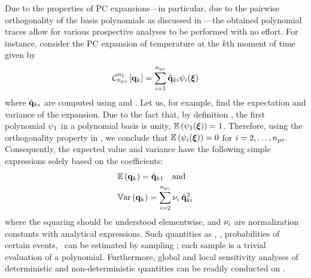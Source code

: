 Due to the properties of PC expansions---in particular, due to the pairwise orthogonality of the basis polynomials as discussed in ---the obtained polynomial traces allow for various prospective analyses to be performed with no effort.
For instance, consider the PC expansion of temperature at the $k$th moment of time given by
\begin{equation} \elabel{pc-k}
  \oPC{\nvars}{\pcorder}{\vTO_k} = \sum_{i = 1}^{\pcterms} \pcc{\vTO}_{ki} \pcb_i(\vZ)
\end{equation}
where $\hat{\mathbf{q}}_{ki}$ are computed using  and . Let us, for example, find the expectation and variance of the expansion.
Due to the fact that, by definition \cite{xiu2010}, the first polynomial $\psi_1$ in a polynomial basis is unity, $\mathbb{E}\left(\psi_1(\boldsymbol{\xi})\right) = 1$.
Therefore, using the orthogonality property in , we conclude that $\mathbb{E}\left(\psi_i(\boldsymbol{\xi})\right) = 0$ for $i = 2, \dotsc, {n_\text{pc}}$.
Consequently, the expected value and variance have the following simple expressions solely based on the coefficients:
\begin{equation} \elabel{pc-moments}
\begin{aligned}
  & \oExp{\vTO_k} = \pcc{\vTO}_{k1} \hspace{1em} \text{and} \\
  & \oVar{\vTO_k} = \sum_{i = 2}^{\pcterms} \pcn_i \: \pcc{\vTO}_{ki}^2
\end{aligned}
\end{equation}
where the squaring should be understood elementwise, and $\nu_i$ are normalization constants with analytical expressions. Such quantities as \cdfs, \pdfs, probabilities of certain events, \etc\ can be estimated by sampling ; each sample is a trivial evaluation of a polynomial. Furthermore, global and local sensitivity analyses of deterministic and non-deterministic quantities can be readily conducted on .
